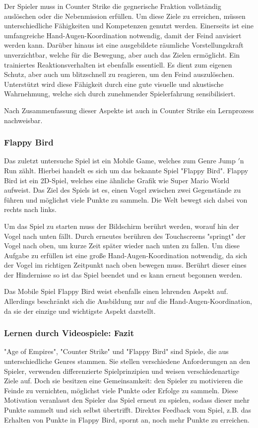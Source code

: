 Der Spieler muss in Counter Strike die gegnerische Fraktion vollständig auslöschen oder die Nebenmission erfüllen. Um diese Ziele zu erreichen, müssen unterschiedliche Fähigkeiten und Kompetenzen genutzt werden. Einerseits ist eine umfangreiche Hand-Augen-Koordination notwendig, damit der Feind anvisiert werden kann. Darüber hinaus ist eine ausgebildete räumliche Vorstellungskraft unverzichtbar, welche für die Bewegung, aber auch das Zielen ermöglicht. Ein trainiertes Reaktionsverhalten ist ebenfalls essentiell. Es dient zum eigenen Schutz, aber auch um blitzschnell zu reagieren, um den Feind auszulöschen. Unterstützt wird diese Fähigkeit durch eine gute visuelle und akustische Wahrnehmung, welche sich durch zunehmender Spielerfahrung sensibilisiert.

Nach Zusammenfassung dieser Aspekte ist auch in Counter Strike ein Lernprozess nachweisbar.

\subsubsection{Flappy Bird}
Das zuletzt untersuche Spiel ist ein Mobile Game, welches zum Genre Jump $'$n Run zählt. Hierbei handelt es sich um das bekannte Spiel "Flappy Bird". Flappy Bird ist ein 2D-Spiel, welches eine ähnliche Grafik wie Super Mario World aufweist. Das Ziel des Spiels ist es, einen Vogel zwischen zwei Gegenstände zu führen und möglichst viele Punkte zu sammeln. Die Welt bewegt sich dabei von rechts nach links.

Um das Spiel zu starten muss der Bildschirm berührt werden, worauf hin der Vogel nach unten fällt. Durch erneutes berühren des Touchscreens "springt" der Vogel nach oben, um kurze Zeit später wieder nach unten zu fallen. Um diese Aufgabe zu erfüllen ist eine große Hand-Augen-Koordination notwendig, da sich der Vogel im richtigen Zeitpunkt nach oben bewegen muss. Berührt dieser eines der Hindernisse so ist das Spiel beendet und es kann erneut begonnen werden.

Das Mobile Spiel Flappy Bird weist ebenfalls einen lehrenden Aspekt auf. Allerdings beschränkt sich die Ausbildung nur auf die Hand-Augen-Koordination, da sie der einzige und wichtigste Aspekt darstellt.

\subsubsection{Lernen durch Videospiele: Fazit}
"Age of Empires", "Counter Strike" und "Flappy Bird" sind Spiele, die aus unterschiedliche Genres stammen. Sie stellen verschiedene Anforderungen an den Spieler, verwenden differenzierte Spielprinzipien und weisen verschiedenartige Ziele auf. Doch sie besitzen eine Gemeinsamkeit: den Spieler zu motivieren die Feinde zu vernichten, möglichst viele Punkte oder Erfolge zu sammeln. Diese Motivation veranlasst den Spieler das Spiel erneut zu spielen, sodass dieser mehr Punkte sammelt und sich selbst übertrifft. Direktes Feedback vom Spiel, z.B. das Erhalten von Punkte in Flappy Bird, spornt an, noch mehr Punkte zu erreichen. 

